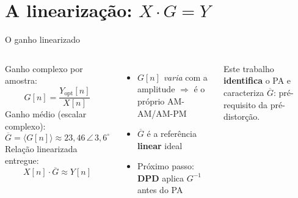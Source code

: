 \documentclass[10pt,aspectratio=169]{beamer}
\begin{document}
\section{A linearização: $X\cdot G = Y$}
\begin{frame}{O ganho linearizado}
  \begin{columns}[c]
    Ganho complexo por amostra:
    \[ G[n]=\frac{Y_{\text{opt}}[n]}{X[n]} \]
    Ganho médio (escalar complexo):
    \[ \overline{G}=\langle G[n]\rangle \approx 23{,}46\,\angle\,3{,}6^\circ \]
    Relação linearizada entregue:
    \[ \boxed{\,X[n]\cdot \overline{G}\approx Y[n]\,} \]
    \footnotesize
    \begin{itemize}\setlength\itemsep{4pt}
      \item $G[n]$ \emph{varia} com a amplitude $\Rightarrow$ é o próprio AM-AM/AM-PM
      \item $\overline{G}$ é a referência \textbf{linear} ideal
      \item Próximo passo: \textbf{DPD} aplica $G^{-1}$ antes do PA
    \end{itemize}
    \vspace{0.2cm}
    Este trabalho \textbf{identifica} o PA e caracteriza $\overline{G}$: pré-requisito da pré-distorção.
  \end{columns}
\end{frame}

\end{document}
